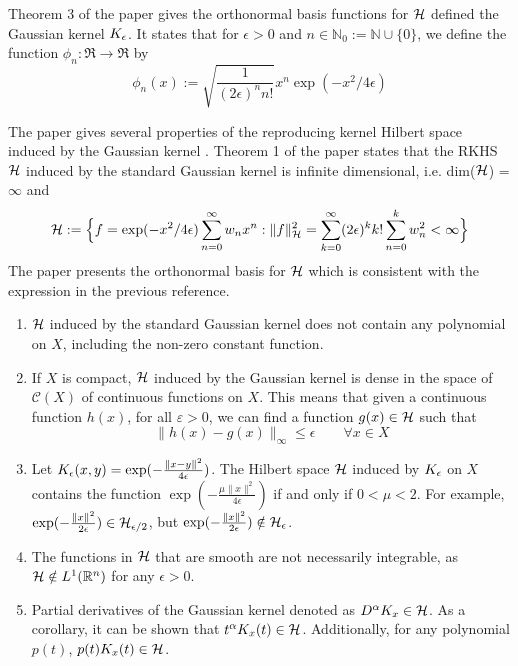 Theorem 3 of the paper gives the orthonormal basis functions for ${\cal H}$ defined the Gaussian kernel $K_\epsilon$. It states that for $\epsilon >0$ and $n \in \mathbb{N}_0 := \mathbb{N} \cup \{0\}$, we define the function $\phi_n : \Re \to \Re$ by
\[
\phi_n(x) := \sqrt{\frac{1}{(2\epsilon)^n n!}}x^n \exp(-x^2/4\epsilon)
\]


The paper gives several properties of the reproducing kernel Hilbert space induced by the Gaussian kernel \cite{min10}.
Theorem 1 of the paper states that the RKHS ${\cal H}$ induced by the standard Gaussian kernel is infinite dimensional, i.e. dim(${\cal H}$) = $\infty$ and 
\[
{\cal H} := \Bigl\{ f = \exp(-x^2/4\epsilon) \sum_{n=0}^\infty w_n x^n: \|f\|^2_{\cal H} = \sum_{k=0}^\infty (2\epsilon)^k k! \sum_{n=0}^k w_n^2 <\infty \Bigr\}
\]
The paper presents the orthonormal basis for ${\cal H}$ which is consistent with the expression in the previous reference. 

\begin{enumerate}
	\item ${\cal H}$ induced by the standard Gaussian kernel does not contain any polynomial on $X$, including the non-zero constant function. 
	
	\item If $X$ is compact, ${\cal H}$ induced by the Gaussian kernel is dense in the space of $\mathcal{C}(X)$ of continuous functions on $X$.
	This means that given a continuous function $h(x)$, for all $\varepsilon >0$, we can find a function $g(x) \in {\cal H}$ such that 
	\[
	\|h(x) - g(x)\|_\infty \leq \epsilon \qquad \forall x \in X
	\] 
	\item Let $K_{\epsilon}(x,y) = \exp(-\frac{\|x-y\|^2}{4\epsilon})$. The Hilbert space ${\cal H}$ induced by $K_\epsilon$ on $X$ contains the function $\exp(-\frac{\mu \|x\|^2} {4 \epsilon})$ if and only if $0<\mu <2$. For example, $\exp(-\frac{\|x\|^2}{2 \epsilon}) \in {\cal H}_{\epsilon/2}$, but  $\exp(-\frac{\|x\|^2}{2 \epsilon}) \notin {\cal H}_{\epsilon}$.
	
	\item The functions in ${\cal H}$ that are smooth are not necessarily integrable, as ${\cal H} \notin L^1(\mathbb{R}^n)$ for any $\epsilon >0$. 
	

\item Partial derivatives of the Gaussian kernel denoted as $D^\alpha K_x \in {\cal H}$. As a corollary, it can be shown that $t^\alpha K_x(t)\in{\cal H}$. Additionally, for any polynomial $p(t)$, $p(t) K_x(t) \in {\cal H}$. 

\end{enumerate}

